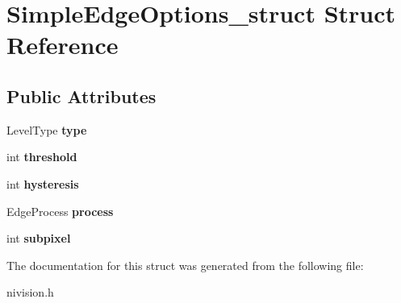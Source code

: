 \hypertarget{structSimpleEdgeOptions__struct}{
\section{SimpleEdgeOptions\_\-struct Struct Reference}
\label{structSimpleEdgeOptions__struct}
}
\subsection*{Public Attributes}
\begin{DoxyCompactItemize}
\item 
\hypertarget{structSimpleEdgeOptions__struct_a4993636d89f092008cfd22e8f34c21e3}{
LevelType {\bfseries type}}
\label{structSimpleEdgeOptions__struct_a4993636d89f092008cfd22e8f34c21e3}

\item 
\hypertarget{structSimpleEdgeOptions__struct_a2c5582eddc42bc325657bd5ebb6c5e9e}{
int {\bfseries threshold}}
\label{structSimpleEdgeOptions__struct_a2c5582eddc42bc325657bd5ebb6c5e9e}

\item 
\hypertarget{structSimpleEdgeOptions__struct_ac844280f0cf0dd41160228c38c3a5ae1}{
int {\bfseries hysteresis}}
\label{structSimpleEdgeOptions__struct_ac844280f0cf0dd41160228c38c3a5ae1}

\item 
\hypertarget{structSimpleEdgeOptions__struct_a504362d6176ae043f255798f919007b3}{
EdgeProcess {\bfseries process}}
\label{structSimpleEdgeOptions__struct_a504362d6176ae043f255798f919007b3}

\item 
\hypertarget{structSimpleEdgeOptions__struct_a5bd7b1763aefd7a2a2c9394562bfe63c}{
int {\bfseries subpixel}}
\label{structSimpleEdgeOptions__struct_a5bd7b1763aefd7a2a2c9394562bfe63c}

\end{DoxyCompactItemize}


The documentation for this struct was generated from the following file:\begin{DoxyCompactItemize}
\item 
nivision.h\end{DoxyCompactItemize}
